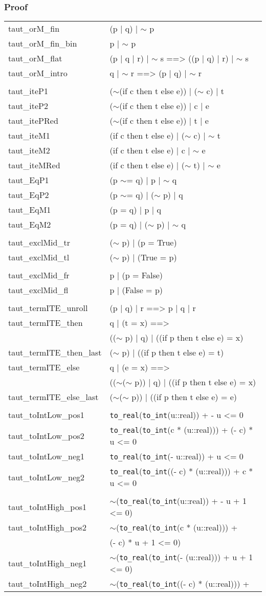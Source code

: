 \documentclass[10pt,a4paper]{article}
\newcommand{\negat}{\ensuremath{\sim}}
\newcommand{\nega}{\negat\xspace}
\newcommand{\torealx}{\texttt{to\_real}}
\newcommand{\tointx}{\texttt{to\_int}}
\newenvironment{ptlong}[1]{\begin{center}\begin{tt}\begin{longtable}{#1}\\[-4mm]\hline}{\end{longtable}\end{tt}\end{center}}
\newcommand{\pl}[1]{#1 \\[1mm]}
\def\ind{\quad}
\begin{document}
\subsubsection*{Proof}
\begin{ptlong}{ll}
	\pl{taut\_orM\_fin & (p | q) | \nega p}
	\pl{taut\_orM\_fin\_bin & p | \nega p}
	\pl{taut\_orM\_flat & (p | q | r) | \nega s ==> ((p | q) | r) | \nega s}
	\pl{taut\_orM\_intro & q | \nega r ==> (p | q) | \nega r}
	\hline & \\[-3mm]
	\pl{taut\_iteP1 & (\nega (if c then t else e)) | (\nega c) | t}
	\pl{taut\_iteP2 & (\nega (if c then t else e)) | c | e}
	\pl{taut\_itePRed & (\nega (if c then t else e)) | t | e}
	\pl{taut\_iteM1 & (if c then t else e) | (\nega c) | \nega t}
	\pl{taut\_iteM2 & (if c then t else e) | c | \nega e}
	\pl{taut\_iteMRed & (if c then t else e) | (\nega t) | \nega e}
	\pl{taut\_EqP1 & (p \negat= q) | p | \nega q}
	\pl{taut\_EqP2 & (p \negat= q) | (\nega p) | q}
	\pl{taut\_EqM1 & (p = q) | p | q}
	\pl{taut\_EqM2 & (p = q) | (\nega p) | \nega q}
	\hline & \\[-3mm]
	\pl{taut\_exclMid\_tr & (\nega p) | (p = True)}
	\pl{taut\_exclMid\_tl & (\nega p) | (True = p)}
	\hline & \\[-3mm]
	\pl{taut\_exclMid\_fr & p | (p = False)}
	\pl{taut\_exclMid\_fl & p | (False = p)}
	\hline & \\[-3mm]
	\pl{taut\_termITE\_unroll & (p | q) | r ==> p | q | r}
	\pl{taut\_termITE\_then & q | (t = x) ==>}
		\pl{& \ind ((\nega p) | q) | ((if p then t else e) = x)}
	\pl{taut\_termITE\_then\_last & (\nega p) | ((if p then t else e) = t)}
	\pl{taut\_termITE\_else & q | (e = x) ==>}
		\pl{& \ind ((\nega (\nega p)) | q) | ((if p then t else e) = x)}
	\pl{taut\_termITE\_else\_last & (\nega (\nega p)) | ((if p then t else e) = e)}
	\hline & \\[-3mm]
	\pl{taut\_toIntLow\_pos1 & \torealx(\tointx(u::real)) + - u <= 0}
	\pl{taut\_toIntLow\_pos2 & \torealx(\tointx(c * (u::real))) + (- c) * u <= 0}
	\pl{taut\_toIntLow\_neg1 & \torealx(\tointx(- u::real)) + u <= 0}
	\pl{taut\_toIntLow\_neg2 & \torealx(\tointx((- c) * (u::real))) + c * u <= 0}
	\hline & \\[-3mm]
	\pl{taut\_toIntHigh\_pos1 & \nega (\torealx(\tointx(u::real)) + - u + 1 <= 0)}
	\pl{taut\_toIntHigh\_pos2 & \nega (\torealx(\tointx(c * (u::real))) +}
		\pl{& \ind\ind (- c) * u + 1 <= 0)}
	\pl{taut\_toIntHigh\_neg1 & \nega (\torealx(\tointx(- (u::real))) + u + 1 <= 0)}
	\pl{taut\_toIntHigh\_neg2 & \nega (\torealx(\tointx((- c) * (u::real))) +}

\end{ptlong}
\end{document}
